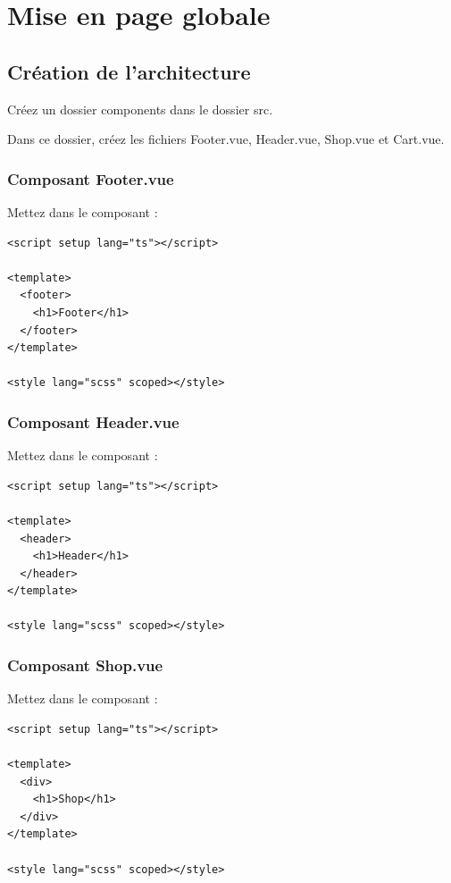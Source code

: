 \documentclass{article}
\begin{document}


\section{Mise en page globale}
\subsection{Création de l'architecture}
Créez un dossier {\color{monOrange}components} dans le dossier {\color{monOrange}src}.

Dans ce dossier, créez les fichiers {\color{monOrange}Footer.vue, Header.vue, Shop.vue} et {\color{monOrange}Cart.vue}.

\subsubsection{Composant {\color{monOrange}Footer.vue}}
Mettez dans le composant :
\begin{verbatim}
<script setup lang="ts"></script>

<template>
  <footer>
    <h1>Footer</h1>
  </footer>
</template>

<style lang="scss" scoped></style>
\end{verbatim}

\subsubsection{Composant {\color{monOrange}Header.vue}}
Mettez dans le composant :
\begin{verbatim}
<script setup lang="ts"></script>

<template>
  <header>
    <h1>Header</h1>
  </header>
</template>

<style lang="scss" scoped></style>
\end{verbatim}

\subsubsection{Composant {\color{monOrange}Shop.vue}}
Mettez dans le composant :
\begin{verbatim}
<script setup lang="ts"></script>

<template>
  <div>
    <h1>Shop</h1>
  </div>
</template>

<style lang="scss" scoped></style>
\end{verbatim}
\end{document}
